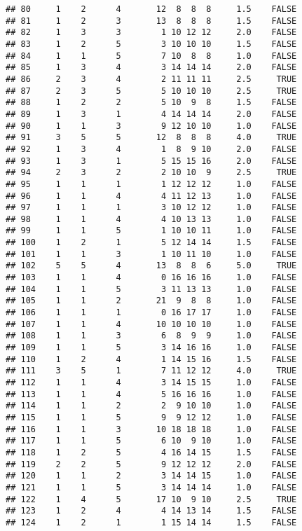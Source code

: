 \documentclass[]{article}
\begin{document}
\begin{verbatim}
## 80     1    2      4       12  8  8  8     1.5    FALSE
## 81     1    2      3       13  8  8  8     1.5    FALSE
## 82     1    3      3        1 10 12 12     2.0    FALSE
## 83     1    2      5        3 10 10 10     1.5    FALSE
## 84     1    1      5        7 10  8  8     1.0    FALSE
## 85     1    3      4        3 14 14 14     2.0    FALSE
## 86     2    3      4        2 11 11 11     2.5     TRUE
## 87     2    3      5        5 10 10 10     2.5     TRUE
## 88     1    2      2        5 10  9  8     1.5    FALSE
## 89     1    3      1        4 14 14 14     2.0    FALSE
## 90     1    1      3        9 12 10 10     1.0    FALSE
## 91     3    5      5       12  8  8  8     4.0     TRUE
## 92     1    3      4        1  8  9 10     2.0    FALSE
## 93     1    3      1        5 15 15 16     2.0    FALSE
## 94     2    3      2        2 10 10  9     2.5     TRUE
## 95     1    1      1        1 12 12 12     1.0    FALSE
## 96     1    1      4        4 11 12 13     1.0    FALSE
## 97     1    1      1        3 10 12 12     1.0    FALSE
## 98     1    1      4        4 10 13 13     1.0    FALSE
## 99     1    1      5        1 10 10 11     1.0    FALSE
## 100    1    2      1        5 12 14 14     1.5    FALSE
## 101    1    1      3        1 10 11 10     1.0    FALSE
## 102    5    5      4       13  8  8  6     5.0     TRUE
## 103    1    1      4        0 16 16 16     1.0    FALSE
## 104    1    1      5        3 11 13 13     1.0    FALSE
## 105    1    1      2       21  9  8  8     1.0    FALSE
## 106    1    1      1        0 16 17 17     1.0    FALSE
## 107    1    1      4       10 10 10 10     1.0    FALSE
## 108    1    1      3        6  8  9  9     1.0    FALSE
## 109    1    1      5        3 14 16 16     1.0    FALSE
## 110    1    2      4        1 14 15 16     1.5    FALSE
## 111    3    5      1        7 11 12 12     4.0     TRUE
## 112    1    1      4        3 14 15 15     1.0    FALSE
## 113    1    1      4        5 16 16 16     1.0    FALSE
## 114    1    1      2        2  9 10 10     1.0    FALSE
## 115    1    1      5        9  9 12 12     1.0    FALSE
## 116    1    1      3       10 18 18 18     1.0    FALSE
## 117    1    1      5        6 10  9 10     1.0    FALSE
## 118    1    2      5        4 16 14 15     1.5    FALSE
## 119    2    2      5        9 12 12 12     2.0    FALSE
## 120    1    1      2        3 14 14 15     1.0    FALSE
## 121    1    1      5        3 14 14 14     1.0    FALSE
## 122    1    4      5       17 10  9 10     2.5     TRUE
## 123    1    2      4        4 14 13 14     1.5    FALSE
## 124    1    2      1        1 15 14 14     1.5    FALSE

\end{verbatim}
\end{document}
